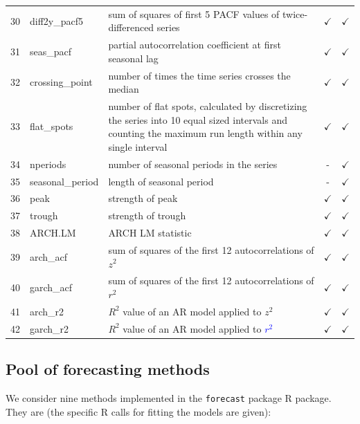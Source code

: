 \documentclass[11pt,a4paper,]{article}
\def\yes{$\checkmark$}
\theoremstyle{definition}
\theoremstyle{definition}
\theoremstyle{definition}
\theoremstyle{remark}
\begin{document}
\begin{table}[!htp]
\begin{tabular}{llp{}cc}
30 & diff2y\_pacf5  & sum of squares of first 5 PACF values of twice-differenced series                       & \yes  & \yes \\
31 & seas\_pacf  & partial autocorrelation coefficient at first seasonal lag                       & \yes  & \yes \\
32 & crossing\_point  & number of times the time series crosses the median                     & \yes  & \yes \\
33 & flat\_spots  & number of flat spots, calculated by discretizing the series into 10 equal sized intervals and counting the maximum run length within any single interval                       & \yes  & \yes \\
34 & nperiods  & number of seasonal periods in the series & -  & \yes \\
35 & seasonal\_period  & length of seasonal period                       & -  & \yes \\
36 & peak  & strength of peak                      & \yes  & \yes \\
37 & trough  & strength of trough                      & \yes  & \yes \\
38 & ARCH.LM  & ARCH LM statistic                      & \yes  & \yes \\
39 & arch\_acf  &    sum of squares of the first 12 autocorrelations of $z^2$               & \yes  & \yes \\
40 & garch\_acf  &  sum of squares of the first 12 autocorrelations of $r^2$                 & \yes  & \yes \\
41 & arch\_r2  &     $R^2$ value of an AR model applied to $z^2$              & \yes  & \yes \\
42 & garch\_r2  &   $R^2$ value of an AR model applied to \textcolor{blue}{$r^2$}               & \yes  & \yes \\
\bottomrule
 \end{tabular}
\end{table}

\subsection{Pool of forecasting
methods}\label{pool-of-forecasting-methods}

We consider nine methods implemented in the \texttt{forecast}
\autocite{forecast} package R package. They are (the specific R calls
for fitting the models are given):
\end{document}
